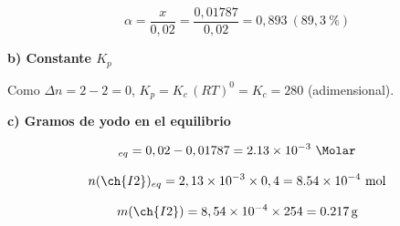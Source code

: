 \begin{exerciseEVAU}
\begin{solu}
        \begin{equation*}
            \alpha = \dfrac{x}{0,02} = \dfrac{0,01787}{0,02} = 0,893 \ (89,3\ \%)
        \end{equation*}

        \textbf{b) Constante \(K_p\)}

        Como \(\Delta n = 2 - 2 = 0\), \(K_p = K_c\, (RT)^0 = K_c = 280\) (adimensional).

        \textbf{c) Gramos de yodo en el equilibrio}

        \begin{equation*}
            [\ch{I2}]_{eq} = 0,02 - 0,01787 = \num{2.13e-3} \ \si{\Molar}
        \end{equation*}

        \begin{equation*}
            n(\ch{I2})_{eq} = 2,13 \times 10^{-3} \times 0,4 = \num{8.54e-4} \ \text{mol}
        \end{equation*}

        \begin{equation*}
            m(\ch{I2}) = 8,54 \times 10^{-4} \times 254 = \SI{0.217}{\gram}
        \end{equation*}

    \end{solu}
\end{exerciseEVAU}

